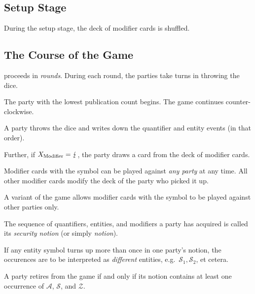 \documentclass{llncs}
\begin{document}
\subsection{Setup Stage}
During the setup stage, the deck of modifier cards is shuffled.

\subsection{The Course of the Game}
\ucftw proceeds in \emph{rounds}.
During each round, the parties take turns in throwing the dice.

\begin{theorem}
	The party with the lowest publication count begins. The game continues counter-clockwise.
\end{theorem}

A party throws the dice and writes down the quantifier and entity events (in that order).


Further, if $X_\text{Modifier} = \lightning$, the party draws a card from the deck of modifier cards. 

\begin{theorem}
	Modifier cards with the \stopsign symbol can be played against \emph{any party} at any time.
	All other modifier cards modify the deck of the party who picked it up. 
\end{theorem}

\begin{remark}
	A variant of the game allows modifier cards with the \stopsign symbol to be played against other parties only.
\end{remark}

\begin{definition}
	The sequence of quantifiers, entities, and modifiers a party has acquired is called its \emph{security notion} (or simply \emph{notion}).
\end{definition}

\begin{theorem}
	If any entity symbol turns up more than once in one party's notion, the occurences are to be interpreted as \emph{different} entities, e.g.\ $\mathcal{S}_1, \mathcal{S}_2$, et cetera.
\end{theorem}

\begin{theorem}
	A party retires from the game if and only if its notion contains at least one occurrence of $\mathcal{A}$, $\mathcal{S}$, and $\mathcal{Z}$.
\end{theorem}
\end{document}
